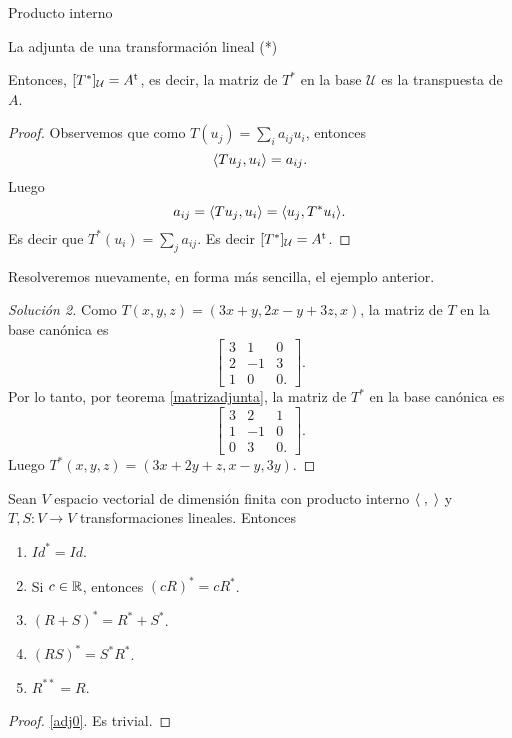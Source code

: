 \begin{chapter}{Producto interno}
\begin{section}{La adjunta de una transformaci\'on lineal (*)}
\begin{teorema}
            Entonces, $[T^*]_{\mathcal U} = A^{\operatorname{t}}$, es decir, la matriz de $T^*$ en la base $\mathcal U$ es la transpuesta de $A$. 
        \end{teorema}
        \begin{proof}
            Observemos  que como $T(u_j) = \sum_i a_{ij}u_i$, entonces 
            $$
            \langle Tu_j,u_i\rangle = a_{ij}.
            $$
            Luego 
            $$
            a_{ij} = \langle Tu_j,u_i\rangle = \langle u_j,T^*u_i\rangle.
            $$
            Es decir  que $T^*(u_i) = \sum_j a_{ij}$. Es decir $[T^*]_{\mathcal U} = A^{\operatorname{t}}$.
        \end{proof}
        
        
    
        
        \begin{ejemplo*} Resolveremos nuevamente, en forma más sencilla, el ejemplo anterior.
        \end{ejemplo*}
        \begin{proof}[Solución 2]
            Como $T(x,y,z) = (3x +y, 2x -y+ 3z, x)$, la matriz de $T$ en la base canónica es 
            $$
            \left[\begin{matrix}
            3&1&0\\2&-1&3\\1&0&0.
            \end{matrix}
            \right].
            $$
            Por lo tanto, por teorema  \ref{matrizadjunta}, la matriz de $T^*$ en la base canónica es
            $$
            \left[\begin{matrix}
            3&2&1\\1&-1&0\\0&3&0.
            \end{matrix}
            \right].
            $$
            Luego $T^*(x,y,z) = (3x+2y+z,x-y,3y)$.
        \end{proof}

    
        
        \begin{proposicion}\label{adjprop}
            Sean $V$ espacio vectorial de dimensión finita con producto interno $\langle \;,\;\rangle$ y $T,S:V \to V$ transformaciones lineales. Entonces
            \begin{enumerate}
                \item\label{adj0} $Id^* = Id$.
                \item\label{adj1} Si $c \in \mathbb R$, entonces $(cR)^* = cR^*$.
                \item\label{adj2} $(R+S)^* = R^* + S^*$.
                \item\label{adj3} $(RS)^* = S^*R^*$.
                \item\label{adj4} $R^{**} = R$.
            \end{enumerate} 
        \end{proposicion}
        \begin{proof}
            \ref{adj0}. Es trivial.
            

\end{proof}
\end{section}
\end{chapter}
